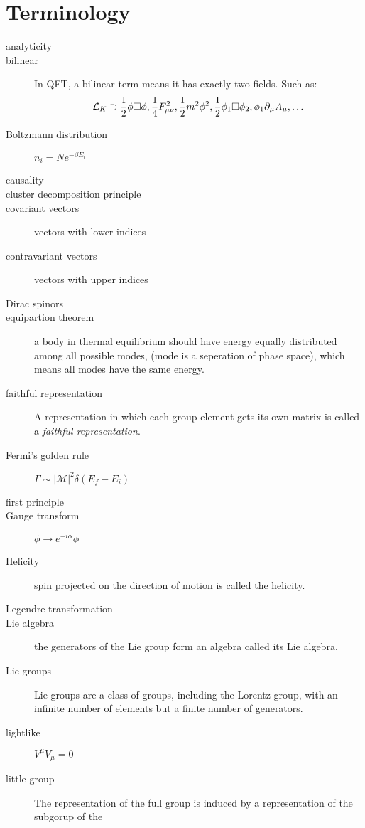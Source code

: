 \chapter{Terminology}
\begin{description}
    \item [analyticity]
    \item [bilinear]	In QFT, a bilinear term means it has exactly two
	fields. Such as:
	\[ \mathcal{L}_K \supset \frac{1}{2}\phi\Box\phi,
	\frac{1}{4}F^2_{\mu\nu}, \frac{1}{2}m^2\phi^2,
	\frac{1}{2}\phi_1\Box\phi_2, \phi_1\partial_\mu A_\mu, \dots \]
    \item [Boltzmann distribution]  $n_{i} = Ne^{-\beta E_{i}}$
    \item [causality]
    \item [cluster decomposition principle]
    \item [covariant vectors]	vectors with lower indices
    \item [contravariant vectors]   vectors with upper indices
    \item [Dirac spinors]
    \item [equipartion theorem] a body in thermal equilibrium should have
	energy equally distributed among all possible modes, (mode is a
	seperation of phase space), which means all modes have the same
	energy.
    \item [faithful representation] A representation in which each group
	element gets its own matrix is called a \emph{faithful
	representation}.
    \item [Fermi's golden rule]	$\Gamma \sim |\mathcal{M}|^{2}\delta(E_f - E_i)$
    \item [first principle]
    \item [Gauge transform] $\phi \rightarrow e^{-i\alpha}\phi$
    \item [Helicity] spin projected on the direction of motion is called the
	helicity.
    \item [Legendre transformation]
    \item [Lie algebra] the generators of the Lie group form an algebra
	called its Lie algebra. 
    \item [Lie groups]	Lie groups are a class of groups, including the
	Lorentz group, with an infinite number of elements but a finite
	number of generators.
    \item [lightlike]	$V^\mu V_\mu = 0$
    \item [little group] The representation of the full \Poincare{}
	group is induced by a representation of the subgorup of the

\end{description}
